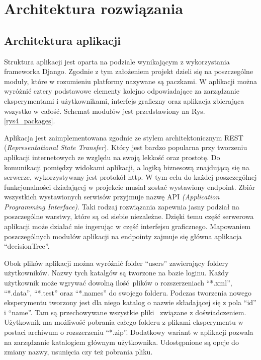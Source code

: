 \chapter{Architektura rozwiązania}
\section{Architektura aplikacji}
Struktura aplikacji jest oparta na podziale wynikającym z wykorzystania frameworka Django. Zgodnie z tym założeniem projekt dzieli się na poszczególne moduły, które w rozumieniu platformy nazywane są paczkami.  W aplikacji można wyróżnić cztery podstawowe elementy kolejno odpowiadające za zarządzanie eksperymentami i użytkownikami, interfejs graficzny oraz aplikacja zbierająca wszystko w całość. Schemat modułów jest przedstawiony na Rys. \ref{rys4_packages}. 

Aplikacja jest zaimplementowana zgodnie ze stylem architektonicznym REST (\textit{Representational State Transfer}). Który jest bardzo popularna przy tworzeniu aplikacji internetowych ze względu na swoją lekkość oraz prostotę. Do komunikacji pomiędzy widokami aplikacji, a logiką biznesową znajdującą się na serwerze, wykorzystywany jest protokół http. W tym celu do każdej poszczególnej funkcjonalności działającej w projekcie musiał zostać wystawiony endpoint. Zbiór wszystkich wystawionych serwisów przyjmuje nazwę API \textit{(Application Programming Interface)}. Taki rodzaj rozwiązania zapewnia jasny podział na poszczególne warstwy, które są od siebie niezależne. Dzięki temu część serwerowa aplikacji może działać nie ingerując w część interfejsu graficznego. Mapowaniem poszczególnych modułów aplikacji na endpointy zajmuje się główna aplikacja \enquote{decisionTree}. 


Obok plików aplikacji można wyróżnić folder \enquote{users} zawierający foldery użytkowników. Nazwy tych katalgów są tworzone na bazie loginu. Każdy użytkownik może wgrywać dowolną ilość plików o rozszerzeniach \enquote{*.xml}, \enquote{*.data}, \enquote{*.test} oraz \enquote{*.names} do swojego folderu. Podczas tworzenia nowego eksperymentu tworzony jest dla niego katalog o nazwie składającej się z pola  \enquote{id} i \enquote{name}. Tam są przechowywane wszystkie pliki  związane z doświadczeniem. Użytkownik ma możliwość pobrania całego folderu z plikami eksperymentu w postaci archiwum o rozszerzeniu  \enquote{*.zip}. Dodatkowy wariant w aplikacji pozwala na zarządzanie katalogiem głównym użytkownika. Udostępnione są opcje do zmiany nazwy, usunięcia czy też pobrania pliku. 

